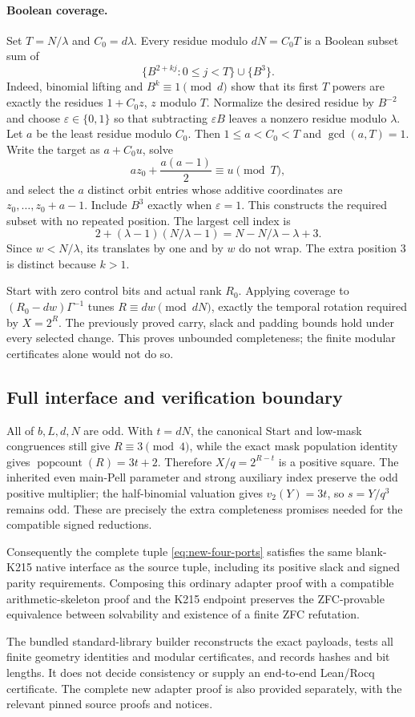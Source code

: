 \paragraph{Boolean coverage.}
Set $T=N/\lambda$ and $C_0=d\lambda$.  Every residue modulo $dN=C_0T$
is a Boolean subset sum of
\[
 \{B^{2+kj}:0\le j<T\}\cup\{B^3\}.
\]
Indeed, binomial lifting and $B^k\equiv1\pmod d$ show that its first
$T$ powers are exactly the residues $1+C_0z$, $z$ modulo $T$.
Normalize the desired residue by $B^{-2}$ and choose
$\varepsilon\in\{0,1\}$ so that subtracting $\varepsilon B$ leaves a
nonzero residue modulo $\lambda$.  Let $a$ be the least residue modulo
$C_0$.  Then $1\le a<C_0<T$ and $\gcd(a,T)=1$.  Write the target as
$a+C_0u$, solve
\[
 az_0+\frac{a(a-1)}2\equiv u\pmod T,
\]
and select the $a$ distinct orbit entries whose additive coordinates are
$z_0,\ldots,z_0+a-1$.  Include $B^3$ exactly when $\varepsilon=1$.
This constructs the required subset with no repeated position.
The largest cell index is
\[
 2+(\lambda-1)(N/\lambda-1)=N-N/\lambda-\lambda+3.
\]
Since $w<N/\lambda$, its translates by one and by $w$ do not wrap.
The extra position 3 is distinct because $k>1$.

Start with zero control bits and actual rank $R_0$.  Applying coverage to
$(R_0-dw)\Gamma^{-1}$ tunes $R\equiv dw\pmod{dN}$, exactly the temporal
rotation required by $X=2^R$.  The previously proved carry, slack and
padding bounds hold under every selected change.  This proves unbounded
completeness; the finite modular certificates alone would not do so.

\subsection{Full interface and verification boundary}

All of $b,L,d,N$ are odd.  With $t=dN$, the canonical Start and low-mask
congruences still give $R\equiv3\pmod4$, while the exact mask population
identity gives $\operatorname{popcount}(R)=3t+2$.  Therefore
$X/q=2^{R-t}$ is a positive square.  The inherited even main-Pell
parameter and strong auxiliary index preserve the odd positive multiplier;
the half-binomial valuation gives $v_2(Y)=3t$, so $s=Y/q^3$ remains odd.
These are precisely the extra completeness promises needed for the
compatible signed reductions.

Consequently the complete tuple \eqref{eq:new-four-ports} satisfies the
same blank-K215 native interface as the source tuple, including its
positive slack and signed parity requirements.  Composing this ordinary
adapter proof with a compatible arithmetic-skeleton proof and the K215
endpoint preserves the ZFC-provable equivalence between solvability and
existence of a finite ZFC refutation.

The bundled standard-library builder reconstructs the exact payloads,
tests all finite geometry identities and modular certificates, and records
hashes and bit lengths.  It does not decide consistency or supply an
end-to-end Lean/Rocq certificate.  The complete new adapter proof is also
provided separately, with the relevant pinned source proofs and notices.
